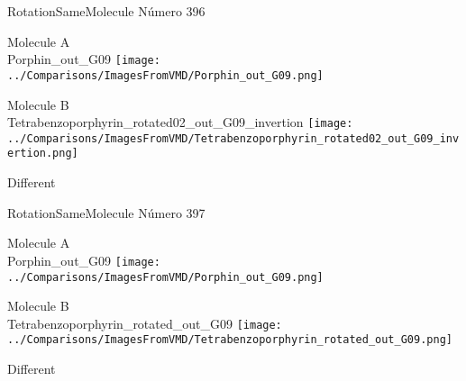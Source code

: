 \vtab[-3cm]
\begin{center}
{\large RotationSameMolecule \tab Número 396}
\end{center}
\begin{multicols}{2}
\begin{center}
Molecule A \\ 
Porphin\_out\_G09
\texttt{[image: ../Comparisons/ImagesFromVMD/Porphin\_out\_G09.png]}
\\
\vtab

\columnbreak
Molecule B \\ 
Tetrabenzoporphyrin\_rotated02\_out\_G09\_invertion
\texttt{[image: ../Comparisons/ImagesFromVMD/Tetrabenzoporphyrin\_rotated02\_out\_G09\_invertion.png]}
\\
\vtab


\end{center}
\end{multicols}
\begin{center}
\textcolor{NavyBlue}{\Large Different}
\end{center}

 \newpage

\vtab[-3cm]
\begin{center}
{\large RotationSameMolecule \tab Número 397}
\end{center}
\begin{multicols}{2}
\begin{center}
Molecule A \\ 
Porphin\_out\_G09
\texttt{[image: ../Comparisons/ImagesFromVMD/Porphin\_out\_G09.png]}
\\
\vtab

\columnbreak
Molecule B \\ 
Tetrabenzoporphyrin\_rotated\_out\_G09
\texttt{[image: ../Comparisons/ImagesFromVMD/Tetrabenzoporphyrin\_rotated\_out\_G09.png]}
\\
\vtab


\end{center}
\end{multicols}
\begin{center}
\textcolor{NavyBlue}{\Large Different}
\end{center}

 \newpage

